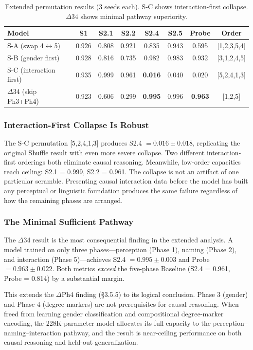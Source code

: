 \documentclass{article}
\begin{document}
\begin{table}[htbp]
\centering
\small
\begin{tabular}{lccccccc}
\toprule
Model & S1 & S2.1 & S2.2 & S2.4 & S2.5 & Probe & Order \\
\midrule
S-A (swap 4$\leftrightarrow$5) & 0.926 & 0.808 & 0.921 & 0.835 & 0.943 & 0.595 & [1,2,3,5,4] \\
S-B (gender first) & 0.928 & 0.816 & 0.735 & 0.982 & 0.983 & 0.932 & [3,1,2,4,5] \\
S-C (interaction first) & 0.935 & 0.999 & 0.961 & \textbf{0.016} & 0.040 & 0.020 & [5,2,4,1,3] \\
$\Delta$34 (skip Ph3+Ph4) & 0.923 & 0.606 & 0.299 & \textbf{0.995} & 0.996 & \textbf{0.963} & [1,2,5] \\
\bottomrule
\end{tabular}
\caption{Extended permutation results (3 seeds each). S-C shows interaction-first collapse. $\Delta$34 shows minimal pathway superiority.}
\label{tab:extended}
\end{table}

\subsubsection{Interaction-First Collapse Is Robust}

The S-C permutation [5,2,4,1,3] produces S2.4 $= 0.016 \pm 0.018$, replicating the original Shuffle result with even more severe collapse. Two different interaction-first orderings both eliminate causal reasoning. Meanwhile, low-order capacities reach ceiling: S2.1 = 0.999, S2.2 = 0.961. The collapse is not an artifact of one particular scramble. Presenting causal interaction data before the model has built any perceptual or linguistic foundation produces the same failure regardless of how the remaining phases are arranged.

\subsubsection{The Minimal Sufficient Pathway}

The $\Delta$34 result is the most consequential finding in the extended analysis. A model trained on only three phases---perception (Phase 1), naming (Phase 2), and interaction (Phase 5)---achieves S2.4 $= 0.995 \pm 0.003$ and Probe $= 0.963 \pm 0.022$. Both metrics \emph{exceed} the five-phase Baseline (S2.4 = 0.961, Probe = 0.814) by a substantial margin.

This extends the $\Delta$Ph4 finding (\S3.5.5) to its logical conclusion. Phase 3 (gender) and Phase 4 (degree markers) are not prerequisites for causal reasoning. When freed from learning gender classification and compositional degree-marker encoding, the 228K-parameter model allocates its full capacity to the perception--naming--interaction pathway, and the result is near-ceiling performance on both causal reasoning and held-out generalization.
\end{document}
